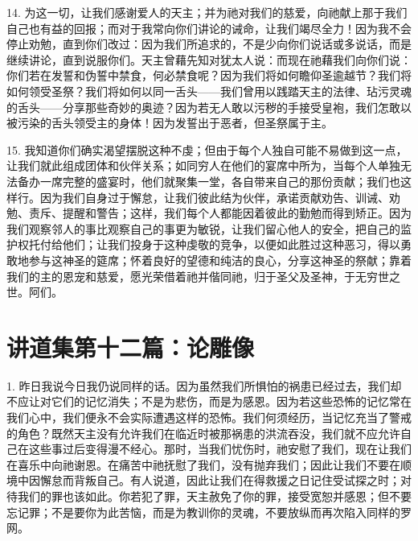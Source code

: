 14. 为这一切，让我们感谢爱人的天主；并为祂对我们的慈爱，向祂献上那于我们自己也有益的回报；而对于我常向你们讲论的诫命，让我们竭尽全力！因为我不会停止劝勉，直到你们改过：因为我们所追求的，不是少向你们说话或多说话，而是继续讲论，直到说服你们。天主曾藉先知对犹太人说：而现在祂藉我们向你们说：你们若在发誓和伪誓中禁食，何必禁食呢？因为我们将如何瞻仰圣逾越节？我们将如何领受圣祭？我们将如何以同一舌头——我们曾用以践踏天主的法律、玷污灵魂的舌头——分享那些奇妙的奥迹？因为若无人敢以污秽的手接受皇袍，我们怎敢以被污染的舌头领受主的身体！因为发誓出于恶者，但圣祭属于主。\par

15. 我知道你们确实渴望摆脱这种不虔；但由于每个人独自可能不易做到这一点，让我们就此组成团体和伙伴关系；如同穷人在他们的宴席中所为，当每个人单独无法备办一席完整的盛宴时，他们就聚集一堂，各自带来自己的那份贡献；我们也这样行。因为我们自身过于懈怠，让我们彼此结为伙伴，承诺贡献劝告、训诫、劝勉、责斥、提醒和警告；这样，我们每个人都能因着彼此的勤勉而得到矫正。因为我们观察邻人的事比观察自己的事更为敏锐，让我们留心他人的安全，把自己的监护权托付给他们；让我们投身于这种虔敬的竞争，以便如此胜过这种恶习，得以勇敢地参与这神圣的筵席；怀着良好的望德和纯洁的良心，分享这神圣的祭献；靠着我们的主的恩宠和慈爱，愿光荣借着祂并偕同祂，归于圣父及圣神，于无穷世之世。阿们。\par



\section{讲道集第十二篇：论雕像}

\par

1. 昨日我说今日我仍说同样的话。因为虽然我们所惧怕的祸患已经过去，我们却不应让对它们的记忆消失；不是为悲伤，而是为感恩。因为若这些恐怖的记忆常在我们心中，我们便永不会实际遭遇这样的恐怖。我们何须经历，当记忆充当了警戒的角色？既然天主没有允许我们在临近时被那祸患的洪流吞没，我们就不应允许自己在这些事过后变得漫不经心。那时，当我们忧伤时，祂安慰了我们，现在让我们在喜乐中向祂谢恩。在痛苦中祂抚慰了我们，没有抛弃我们；因此让我们不要在顺境中因懈怠而背叛自己。有人说道，因此让我们在得救援之日记住受试探之时；对待我们的罪也该如此。你若犯了罪，天主赦免了你的罪，接受宽恕并感恩；但不要忘记罪；不是要你为此苦恼，而是为教训你的灵魂，不要放纵而再次陷入同样的罗网。\par

